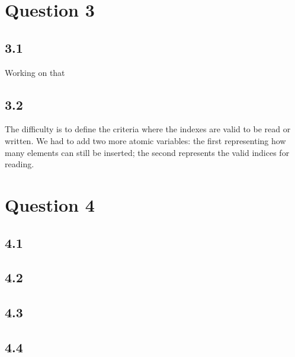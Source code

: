 \documentclass[11pt, letterpaper]{article}
\begin{document}
\section*{Question 3}
\subsection*{3.1}
Working on that
\subsection*{3.2}
The difficulty is to define the criteria where the indexes are valid to be read or written. We had to add two more atomic variables: the first representing how many elements can still be inserted; the second represents the valid indices for reading.

\section*{Question 4}
\subsection*{4.1}

\subsection*{4.2}

\subsection*{4.3}

\subsection*{4.4}
\end{document}
